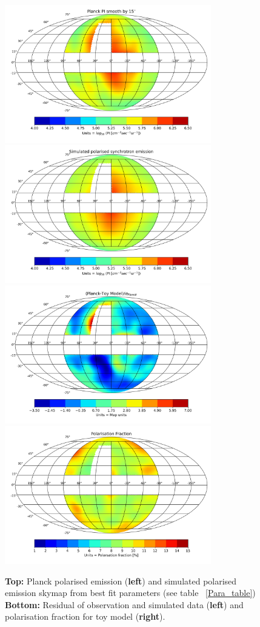 \documentclass[12pt, a4 paper]{article}
\begin{document}
\begin{figure}[h!]
        \centering
        \includegraphics[width =9cm]{Images/Jan-17-2022_Planck_Sky_Map.png}%
        \includegraphics[width=9cm]{Images/Jan-20-2022Ver1_Skymap_Bstr_3_Btur_6_Rmag_5_Zmag_7_norm_3.76e-13.png}
        \includegraphics[width = 9cm]{Images/Jan-20-2022_Residue_Bstr_3_Btur_6_Rmag_5_Zmag_7_norm_3.76e-13.png}%
        \includegraphics[width =9cm]{Images/Jan-20-2022_Pol_Frac_30GHz_Total_Skymap_Bstr_3_Btur_6_Rmag_5_Zmag_7_norm_-1.24e+01.png}

    \caption{\textbf{Top:} Planck polarised emission (\textbf{left}) and simulated polarised emission skymap from best fit parameters (see table ~\ref{Para_table})
            \newline \textbf{Bottom:} Residual of observation and simulated data (\textbf{left}) and polarisation fraction for toy model (\textbf{right}).}
    \label{fig:Skymaps}
\end{figure}
\end{document}
